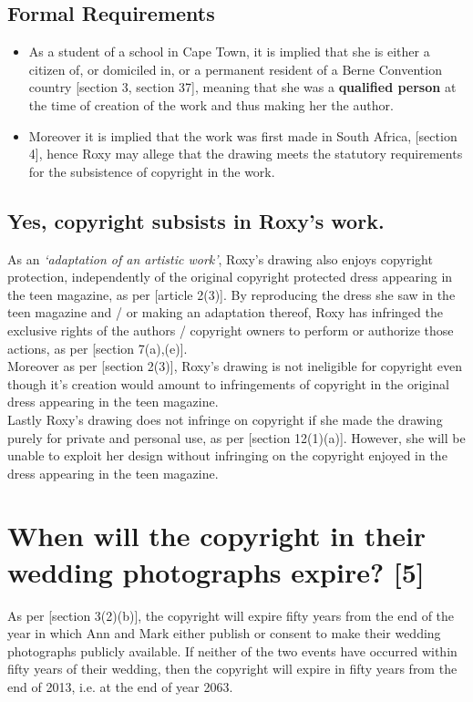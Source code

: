\documentclass[11pt]{article}
\begin{document}
\subsection{Formal Requirements}
\label{sec:org3471830}
\begin{itemize}
\item As a student of a school in Cape Town, it is implied that she is either a
citizen of, or domiciled in, or a permanent resident of a Berne
Convention country [section 3, section 37]\cite{wipo86_berne},
meaning that she was a \textbf{qualified person} at the time of creation
of the work and thus making her the author.
\item Moreover it is implied that the work was first made in South
Africa, [section 4]\cite{rsa78_copyrightact}, hence Roxy may allege
that the drawing meets the statutory requirements for the
subsistence of copyright in the work.
\end{itemize}

\subsection{Yes, copyright subsists in Roxy's work.}
\label{sec:org5e9178f}
As an \emph{`adaptation of an artistic work'}, Roxy's drawing also enjoys copyright
protection, independently of the original copyright protected dress appearing in
the teen magazine, as per [article 2(3)]\cite{wipo86_berne}. By reproducing the
dress she saw in the teen magazine and / or making an adaptation thereof, Roxy
has infringed the exclusive rights of the authors / copyright owners to perform or
authorize those actions, as per [section 7(a),(e)]\cite{rsa78_copyrightact}.\\

Moreover as per [section 2(3)]\cite{rsa78_copyrightact}, Roxy's drawing is not
ineligible for copyright even though it's creation would
amount to infringements of copyright in the original dress appearing in the teen
magazine.\\

Lastly Roxy's drawing does not infringe on copyright if she made the drawing
purely for private and personal use, as per [section
12(1)(a)]\cite{rsa78_copyrightact}. However, she will be unable to exploit her
design without infringing on the copyright enjoyed in the dress appearing in the
teen magazine.

\section{When will the copyright in their wedding photographs expire? [5]}
\label{sec:org88eb51f}
As per [section 3(2)(b)]\cite{rsa78_copyrightact}, the copyright will expire fifty
years from the end of the year in which Ann and Mark either publish or consent
to make their wedding photographs publicly available. If neither of the two
events have occurred within fifty years of their wedding, then the copyright
will expire in fifty years from the end of 2013, i.e. at the end of year 2063.
\end{document}
